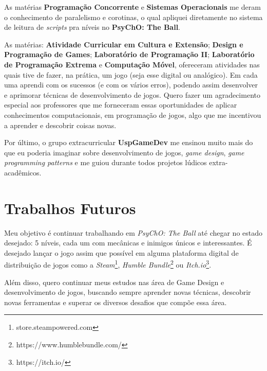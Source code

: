 As matérias \textbf{Programação Concorrente} e \textbf{Sistemas Operacionais} me deram o conhecimento de paralelismo e corotinas, o qual apliquei diretamente no sistema de leitura de \textit{scripts} pra níveis no \textbf{PsyChO: The Ball}.

As matérias: \textbf{Atividade Curricular em Cultura e Extensão}; \textbf{Design e Programação de Games}; \textbf{Laboratório de Programação II}; \textbf{Laboratório de Programação Extrema} e \textbf{Computação Móvel}, ofereceram atividades nas quais tive de fazer, na prática, um jogo (seja esse digital ou analógico). Em cada uma aprendi com os sucessos (e com os vários erros), podendo assim desenvolver e aprimorar técnicas de desenvolvimento de jogos. Quero fazer um agradecimento especial aos professores que me forneceram essas oportunidades de aplicar conhecimentos computacionais, em programação de jogos, algo que me incentivou a aprender e descobrir coisas novas.

Por último, o grupo extracurricular \textbf{UspGameDev} me ensinou muito mais do que eu poderia imaginar sobre desenvolvimento de jogos, \textit{game design}, \textit{game programming patterns} e me guiou durante todos projetos lúdicos extra-acadêmicos.

\section{Trabalhos Futuros}
\label{sec:trabalhos_futuros}

Meu objetivo é continuar trabalhando em \textit{PsyChO: The Ball} até chegar no estado desejado: 5 níveis, cada um com mecânicas e inimigos únicos e interessantes. É desejado lançar o jogo assim que possível em alguma plataforma digital de distribuição de jogos como a \textit{Steam}\footnote{store.steampowered.com}, \textit{Humble Bundle}\footnote{https://www.humblebundle.com/} ou \textit{Itch.io}\footnote{https://itch.io/}.

Além disso, quero continuar meus estudos nas área de Game Design e desenvolvimento de jogos, buscando sempre aprender novas técnicas, descobrir novas ferramentas e superar os diversos desafios que compõe essa área.
